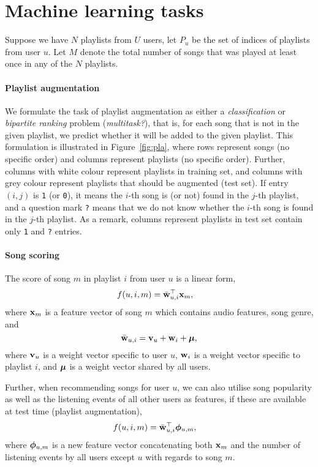 \section{Machine learning tasks}

Suppose we have $N$ playlists from $U$ users, let $P_u$ be the set of indices of playlists from user $u$.
Let $M$ denote the total number of songs that was played at least once in any of the $N$ playlists.


\paragraph{Playlist augmentation}

We formulate the task of playlist augmentation as either a \emph{classification} or \emph{bipartite ranking} problem ({\it multitask?}),
that is, for each song that is not in the given playlist, 
we predict whether it will be added to the given playlist.
This formulation is illustrated in Figure~\ref{fig:pla},
where rows represent songs (no specific order) and columns represent playlists (no specific order).
Further, columns with white colour represent playlists in training set, 
and columns with grey colour represent playlists that should be augmented (\ie test set).
If entry $(i, j)$ is \texttt{1} (or \texttt{0}), 
it means the $i$-th song is (or not) found in the $j$-th playlist, 
and a question mark \texttt{?} means that we do not know whether the $i$-th song is found in the $j$-th playlist.
As a remark, columns represent playlists in test set contain only \texttt{1} and \texttt{?} entries.




\paragraph{Song scoring}

The score of song $m$ in playlist $i$ from user $u$ is a linear form,
\begin{equation*}
\begin{aligned}
f(u, i, m) &= \bar{\mathbf{w}}_{u,i}^\top \mathbf{x}_m,
\end{aligned}
\end{equation*}
where $\mathbf{x}_m$ is a feature vector of song $m$ which contains audio features, song genre, and 
\begin{equation*}
\bar{\mathbf{w}}_{u,i} = \mathbf{v}_u + \mathbf{w}_i + \bm{\mu},
\end{equation*}
where $\mathbf{v}_u$ is a weight vector specific to user $u$,
$\mathbf{w}_i$ is a weight vector specific to playlist $i$,
and $\bm{\mu}$ is a weight vector shared by all users.

Further, when recommending songs for user $u$, we can also utilise song popularity as well as the listening events of all other users as features,
if these are available at test time (\eg playlist augmentation), \ie
\begin{equation*}
\begin{aligned}
f(u, i, m) &= \bar{\mathbf{w}}_{u,i}^\top \bm{\phi}_{u,m},
\end{aligned}
\end{equation*}
where $\bm{\phi}_{u,m}$ is a new feature vector concatenating both $\mathbf{x}_m$ 
and the number of listening events by all users except $u$ with regards to song $m$.
